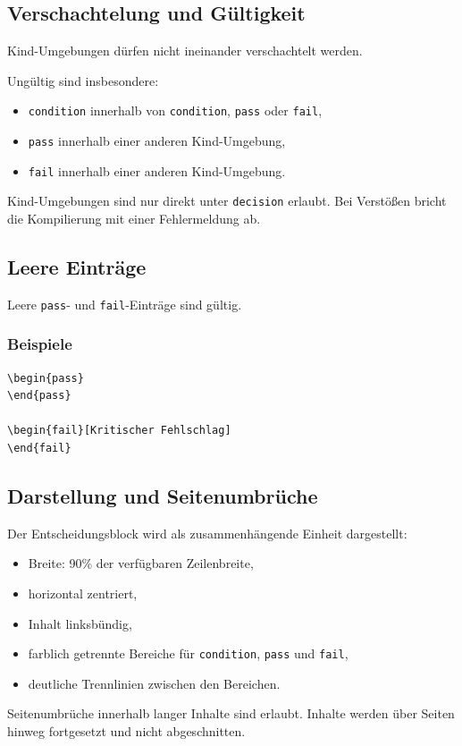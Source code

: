 \subsection{Verschachtelung und Gültigkeit}

Kind-Umgebungen dürfen nicht ineinander verschachtelt werden.

Ungültig sind insbesondere:

\begin{itemize}
\item \verb|condition| innerhalb von \verb|condition|, \verb|pass| oder \verb|fail|,
\item \verb|pass| innerhalb einer anderen Kind-Umgebung,
\item \verb|fail| innerhalb einer anderen Kind-Umgebung.
\end{itemize}

Kind-Umgebungen sind nur direkt unter \verb|decision| erlaubt.
Bei Verstößen bricht die Kompilierung mit einer Fehlermeldung ab.


\subsection{Leere Einträge}

Leere \verb|pass|- und \verb|fail|-Einträge sind gültig.

\subsubsection*{Beispiele}

\begin{Verbatim}
\begin{pass}
\end{pass}

\begin{fail}[Kritischer Fehlschlag]
\end{fail}
\end{Verbatim}


\subsection{Darstellung und Seitenumbrüche}

Der Entscheidungsblock wird als zusammenhängende Einheit dargestellt:

\begin{itemize}
\item Breite: 90\% der verfügbaren Zeilenbreite,
\item horizontal zentriert,
\item Inhalt linksbündig,
\item farblich getrennte Bereiche für \verb|condition|, \verb|pass| und \verb|fail|,
\item deutliche Trennlinien zwischen den Bereichen.
\end{itemize}

Seitenumbrüche innerhalb langer Inhalte sind erlaubt.
Inhalte werden über Seiten hinweg fortgesetzt und nicht abgeschnitten.
